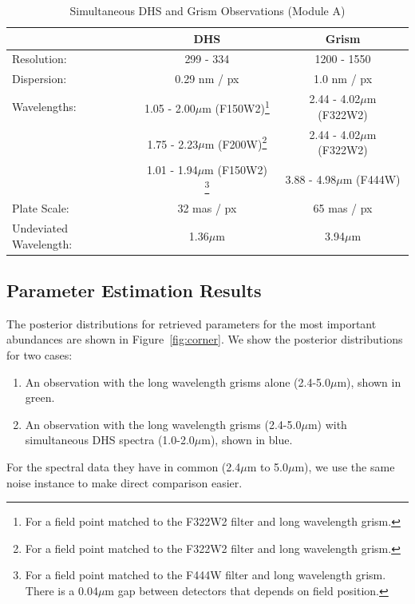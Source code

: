 \documentclass[iop]{emulateapj}
\newcommand{\DHSres}{299 - 334}
\newcommand{\DHSgap}{0.04}
\begin{document}
\begin{table}[!t]
\centering
\caption{Simultaneous DHS and Grism Observations (Module A)}\label{tab:DHSgprop}
\begin{tabular}{lcc}
\hline \hline
 & DHS & Grism \\
\hline \hline		
Resolution: &  \DHSres & 1200 - 1550 \\
Dispersion: & 0.29 nm / px & 1.0 nm / px \\
Wavelengths: & 1.05 - 2.00$\mu$m (F150W2)\footnote{For a field point matched to the F322W2 filter and long wavelength grism.} & 2.44 - 4.02$\mu$m (F322W2)\\
			 & 1.75 - 2.23$\mu$m (F200W)\footnote{For a field point matched to the F322W2 filter and long wavelength grism.} & 2.44 - 4.02$\mu$m (F322W2)\\
			& 	1.01 - 1.94$\mu$m (F150W2) \footnote{For a field point matched to the F444W filter and long wavelength grism. There is a \DHSgap$\mu$m gap between detectors that depends on field position.}	& 3.88 - 4.98$\mu$m (F444W) \\
Plate Scale: & 32 mas / px  &  65 mas / px\\
Undeviated Wavelength: & 1.36$\mu$m & 3.94$\mu$m   \\
\hline
\end{tabular}
\end{table}


\subsection{Parameter Estimation Results}\label{sec:retrievals}

The posterior distributions for retrieved parameters for the most important abundances are shown in Figure~\ref{fig:corner}.
We show the posterior distributions for two cases:
\begin{enumerate}
\item \label{it:DHSgr} An observation with the long wavelength grisms alone (2.4-5.0$\mu$m), shown in green.
\item \label{it:grAlone} An observation with the long wavelength grisms (2.4-5.0$\mu$m) with simultaneous DHS spectra (1.0-2.0$\mu$m), shown in blue.
\end{enumerate}
For the spectral data they have in common (2.4$\mu$m to 5.0$\mu$m), we use the same noise instance to make direct comparison easier.
\end{document}
